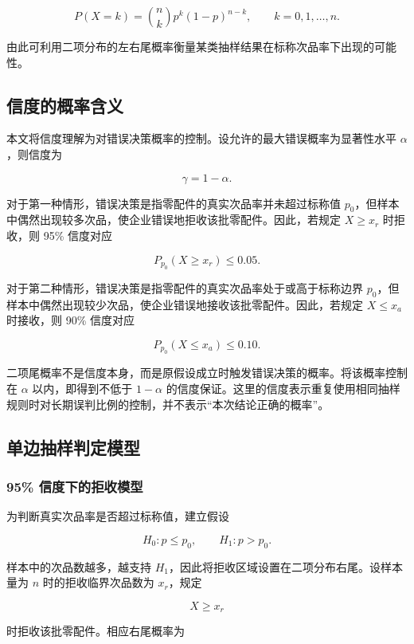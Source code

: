 \documentclass{cumcm}
\numberwithin{figure}{section}
\numberwithin{table}{section}
\begin{document}
\[
P(X=k)=\binom{n}{k}p^k(1-p)^{n-k},
\qquad k=0,1,\ldots,n. \tag{2}
\]

由此可利用二项分布的左右尾概率衡量某类抽样结果在标称次品率下出现的可能性。

\subsection{信度的概率含义}\label{ux4fe1ux5ea6ux7684ux6982ux7387ux542bux4e49}

本文将信度理解为对错误决策概率的控制。设允许的最大错误概率为显著性水平 \(\alpha\)，则信度为

\[
\gamma=1-\alpha. \tag{3}
\]

对于第一种情形，错误决策是指零配件的真实次品率并未超过标称值 \(p_0\)，但样本中偶然出现较多次品，使企业错误地拒收该批零配件。因此，若规定 \(X\ge x_r\) 时拒收，则 95\% 信度对应

\[
P_{p_0}(X\ge x_r)\le0.05. \tag{4}
\]

对于第二种情形，错误决策是指零配件的真实次品率处于或高于标称边界 \(p_0\)，但样本中偶然出现较少次品，使企业错误地接收该批零配件。因此，若规定 \(X\le x_a\) 时接收，则 90\% 信度对应

\[
P_{p_0}(X\le x_a)\le0.10. \tag{5}
\]

二项尾概率不是信度本身，而是原假设成立时触发错误决策的概率。将该概率控制在 \(\alpha\) 以内，即得到不低于 \(1-\alpha\) 的信度保证。这里的信度表示重复使用相同抽样规则时对长期误判比例的控制，并不表示``本次结论正确的概率''。

\subsection{单边抽样判定模型}\label{ux5355ux8fb9ux62bdux6837ux5224ux5b9aux6a21ux578b}

\subsubsection{95\% 信度下的拒收模型}\label{ux4fe1ux5ea6ux4e0bux7684ux62d2ux6536ux6a21ux578b}

为判断真实次品率是否超过标称值，建立假设

\[
H_0:p\le p_0,\qquad H_1:p>p_0. \tag{6}
\]

样本中的次品数越多，越支持 \(H_1\)，因此将拒收区域设置在二项分布右尾。设样本量为 \(n\) 时的拒收临界次品数为 \(x_r\)，规定

\[
X\ge x_r
\]

时拒收该批零配件。相应右尾概率为
\end{document}
